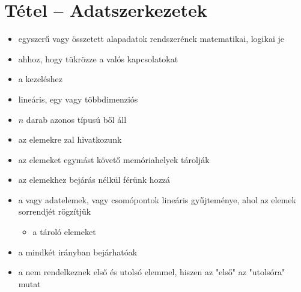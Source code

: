 \documentclass[main.tex]{subfiles}
\begin{document}
  \section{Tétel – Adatszerkezetek} %
  \begin{itemize}
    \item egyszerű vagy összetett alapadatok
    rendszerének matematikai, logikai je

    \item {} ahhoz, hogy tükrözze a valós kapcsolatokat
    
    \item {} a kezeléshez
  \end{itemize}

  \begin{itemize}
    \item lineáris, egy vagy többdimenziós
    
    \item $n$ darab azonos típusú ből áll
    
    \item az elemekre zal hivatkozunk
    
    \item az elemeket egymást követő memóriahelyek tárolják

    \item az elemekhez bejárás nélkül férünk hozzá
  \end{itemize}

  \begin{itemize}
    \item a  vagy 
    adatelemek, vagy csomópontok lineáris gyűjteménye,
    ahol az elemek sorrendjét rögzítjük
    \begin{itemize}
      \item a  tároló elemeket
    \end{itemize}

    \item a  mindkét irányban bejárhatóak
    
    \item a  nem rendelkeznek
    első és utolsó elemmel, hiszen az "első" az "utolsóra" mutat
  \end{itemize}
\end{document}
